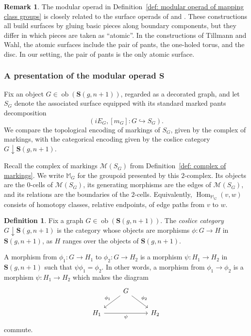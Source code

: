 \documentclass{amsart}
\newcommand{\bS}{\mathbf{S}}
\newcommand{\calM}{\mathcal{M}}
\newcommand{\Hom}{\operatorname{Hom}}
\newcommand{\ob}{\operatorname{ob}}
\theoremstyle{definition}
\newtheorem{definition}[theorem]{Definition}%
\newtheorem{remark}[theorem]{Remark}%
\numberwithin{equation}{section}
\begin{document}
\begin{remark}
The modular operad in Definition~\ref{def: modular operad of mapping class groups} is closely related to the surface operads of \cite[Construction 2.2]{Till_surface_operad} and \cite[Section 3.1]{Wahl_infinite_loop_space}. These constructions all build surfaces by gluing basic pieces along boundary components, but they differ in which pieces are taken as ``atomic''. In the constructions of Tillmann and Wahl, the atomic surfaces include the pair of pants, the one-holed torus, and the disc. In our setting, the pair of pants is the only atomic surface.
\end{remark}

\subsubsection{A presentation of the modular operad $\bS$}\label{sec: presentation of modular operad}
Fix an object $G\in\ob(\bS(g,n+1))$, regarded as a decorated graph, and let $S_G$ denote the associated surface equipped with its standard marked pants
decomposition
\[
(iE_G,[m_G]:G\hookrightarrow S_G).
\]
We compare the topological encoding of markings of $S_G$, given by the complex of markings, with the categorical encoding given by the coslice category $G\downarrow \bS(g,n+1)$.


Recall the complex of markings $\calM(S_G)$ from Definition~\ref{def: complex of markings}. We write $\mathbb{M}_G$ for the groupoid presented by this $2$-complex. Its objects are the $0$-cells of $\calM(S_G)$, its generating morphisms are the edges of
$\calM(S_G)$, and its relations are the boundaries of the $2$-cells. Equivalently, $\Hom_{\mathbb{M}_G}(v,w)$ consists of homotopy classes, relative endpoints, of edge paths from $v$ to $w$.


\begin{definition}\label{defn: coslice S under G}
Fix a graph $G\in \ob(\bS(g,n+1))$. The \emph{coslice category} $G\downarrow \bS(g,n+1)$ is the category whose objects are morphisms $\phi:G\to H$ in $\bS(g,n+1)$, as $H$ ranges over the objects of $\bS(g,n+1)$.

A morphism from $\phi_1:G\to H_1$ to $\phi_2:G\to H_2$ is a morphism $\psi:H_1\to H_2$ in $\bS(g,n+1)$ such that $\psi\phi_1=\phi_2$. In other words, a morphism from $\phi_1\rightarrow \phi_2$ is a morphism $\psi:H_1\to H_2$ which makes the diagram
\[
\begin{tikzcd}
& G \arrow[dl, "\phi_1"'] \arrow[dr, "\phi_2"] & \\
H_1 \arrow[rr, "\psi"'] && H_2
\end{tikzcd}
\]
commute.
\end{definition}
\end{document}
